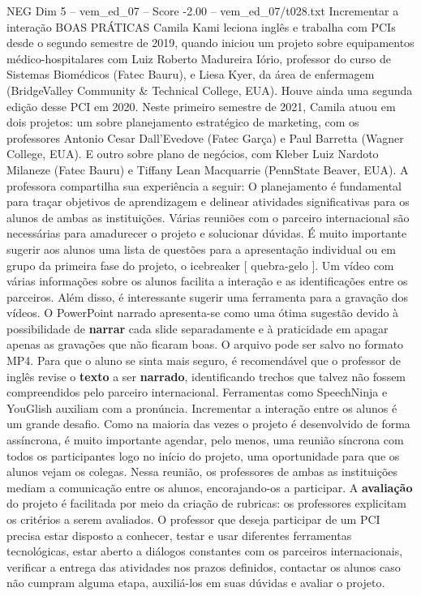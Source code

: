 \begin{textsample}{NEG Dim 5 – vem\_ed\_07 – Score -2.00 – vem\_ed\_07/t028.txt}  \label{ex:f5_neg_016}
Incrementar a interação BOAS PRÁTICAS Camila Kami leciona inglês e trabalha com PCIs desde o segundo semestre de 2019, quando iniciou um projeto sobre equipamentos médico-hospitalares com Luiz Roberto Madureira Iório, professor do curso de Sistemas Biomédicos (Fatec Bauru), e Liesa Kyer, da área de enfermagem (BridgeValley Community \& Technical College, EUA).
Houve ainda uma segunda edição desse PCI em 2020.
Neste primeiro semestre de 2021, Camila atuou em dois projetos: um sobre planejamento estratégico de marketing, com os professores Antonio Cesar Dall’Evedove (Fatec Garça) e Paul Barretta (Wagner College, EUA).
E outro sobre plano de negócios, com Kleber Luiz Nardoto Milaneze (Fatec Bauru) e Tiffany Lean Macquarrie (PennState Beaver, EUA).
A professora compartilha sua experiência a seguir: O planejamento é fundamental para traçar objetivos de aprendizagem e delinear atividades significativas para os alunos de ambas as instituições.
Várias reuniões com o parceiro internacional são necessárias para amadurecer o projeto e solucionar dúvidas.
É muito importante sugerir aos alunos uma lista de questões para a apresentação individual ou em grupo da primeira fase do projeto, o icebreaker [ quebra-gelo ].
Um vídeo com várias informações sobre os alunos facilita a interação e as identificações entre os parceiros.
Além disso, é interessante sugerir uma ferramenta para a gravação dos vídeos.
O PowerPoint narrado apresenta-se como uma ótima sugestão devido à possibilidade de \textbf{narrar} cada slide separadamente e à praticidade em apagar apenas as gravações que não ficaram boas.
O arquivo pode ser salvo no formato MP4.
Para que o aluno se sinta mais seguro, é recomendável que o professor de inglês revise o \textbf{texto} a ser \textbf{narrado}, identificando trechos que talvez não fossem compreendidos pelo parceiro internacional.
Ferramentas como SpeechNinja e YouGlish auxiliam com a pronúncia.
Incrementar a interação entre os alunos é um grande desafio.
Como na maioria das vezes o projeto é desenvolvido de forma assíncrona, é muito importante agendar, pelo menos, uma reunião síncrona com todos os participantes logo no início do projeto, uma oportunidade para que os alunos vejam os colegas.
Nessa reunião, os professores de ambas as instituições mediam a comunicação entre os alunos, encorajando-os a participar.
A \textbf{avaliação} do projeto é facilitada por meio da criação de rubricas: os professores explicitam os critérios a serem avaliados.
O professor que deseja participar de um PCI precisa estar disposto a conhecer, testar e usar diferentes ferramentas tecnológicas, estar aberto a diálogos constantes com os parceiros internacionais, verificar a entrega das atividades nos prazos definidos, contactar os alunos caso não cumpram alguma etapa, auxiliá-los em suas dúvidas e avaliar o projeto.

\end{textsample}
